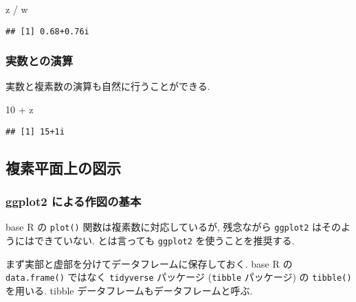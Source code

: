 \documentclass[a4paper]{scrbook}
\newenvironment{Shaded}{\begin{snugshade}}{\end{snugshade}}
\newcommand{\KeywordTok}[1]{\textcolor[rgb]{0.13,0.29,0.53}{\textbf{{#1}}}}
\newcommand{\DataTypeTok}[1]{\textcolor[rgb]{0.13,0.29,0.53}{{#1}}}
\newcommand{\DecValTok}[1]{\textcolor[rgb]{0.00,0.00,0.81}{{#1}}}
\newcommand{\StringTok}[1]{\textcolor[rgb]{0.31,0.60,0.02}{{#1}}}
\newcommand{\NormalTok}[1]{{#1}}
\theoremstyle{definition}
\begin{document}
\begin{Shaded}
\begin{Highlighting}[]
\NormalTok{z /}\StringTok{ }\NormalTok{w}
\end{Highlighting}
\end{Shaded}

\begin{verbatim}
## [1] 0.68+0.76i
\end{verbatim}

\subsubsection*{実数との演算}

実数と複素数の演算も自然に行うことができる.

\begin{Shaded}
\begin{Highlighting}[]
\DecValTok{10} \NormalTok{+}\StringTok{ }\NormalTok{z}
\end{Highlighting}
\end{Shaded}

\begin{verbatim}
## [1] 15+1i
\end{verbatim}

\subsection*{複素平面上の図示}

\subsubsection*{ggplot2 による作図の基本}\label{ggplot2-}

base R の \texttt{plot()} 関数は複素数に対応しているが, 残念ながら
\texttt{ggplot2} はそのようにはできていない. とは言っても
\texttt{ggplot2} を使うことを推奨する.

まず実部と虚部を分けてデータフレームに保存しておく. base R の
\texttt{data.frame()} ではなく \texttt{tidyverse} パッケージ
(\texttt{tibble} パッケージ) の \texttt{tibble()} を用いる. tibble
データフレームもデータフレームと呼ぶ.

\begin{Shaded}
\end{Shaded}
\end{document}
